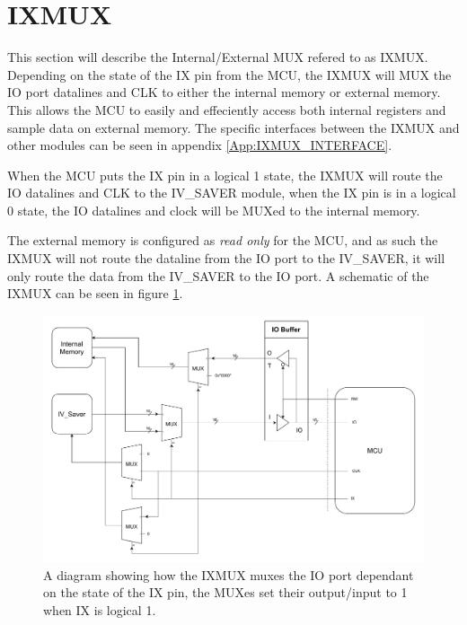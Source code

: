 \section{IXMUX} \label{subsec:IXMUX}
This section will describe the Internal/External MUX refered to as IXMUX. Depending on the state of the IX pin from the MCU, the IXMUX
will MUX the IO port datalines and CLK to either the internal memory or external memory. This allows the MCU to easily and effeciently
 access both internal registers and sample data on external memory. The specific interfaces between the IXMUX and other modules can be
 seen in appendix \ref{App:IXMUX_INTERFACE}.

When the MCU puts the IX pin in a logical 1 state, the IXMUX will route the IO datalines and CLK to the IV\_SAVER
module, when the IX pin is in a logical 0 state, the IO datalines and clock will be MUXed to the internal memory. 

The external memory is configured as \textit{read only} for the MCU, and as such the IXMUX will not route the dataline from the IO port to the IV\_SAVER, it will only route the data from the IV\_SAVER to the IO port. A schematic of the IXMUX can be seen in figure \ref{fig_7_2_1.5_IXMUX_schematic}.

\begin{figure}[H]
    \centering
    \includegraphics[clip, trim=0 0 0 0, width=1\textwidth]{Sections/7_SystemDesign/Figures/IXMUX_Functionality.pdf}
    \caption{A diagram showing how the IXMUX muxes the IO port dependant on the state of the IX pin, the MUXes set their output/input to 1 when IX is logical 1.}
    \label{fig_7_2_1.5_IXMUX_schematic}
\end{figure}


